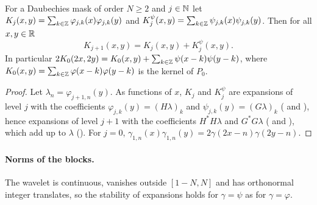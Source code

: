 \begin{proposition}
\label{prop:daub-kernel-identity}
\leanok
{}
For a Daubechies mask of order $N \geq 2$ and $j \in \mathbb{N}$ let
$K_j(x, y) = \sum_{k \in \mathbb{Z}} \varphi_{j,k}(x) \varphi_{j,k}(y)$ and
$K^\psi_j(x, y) = \sum_{k \in \mathbb{Z}} \psi_{j,k}(x) \psi_{j,k}(y)$. Then for all $x, y \in \mathbb{R}$
\[
  K_{j+1}(x, y) = K_j(x, y) + K^\psi_j(x, y) .
\]
In particular $2 K_0(2x, 2y) = K_0(x, y) + \sum_{k \in \mathbb{Z}} \psi(x - k) \psi(y - k)$, where
$K_0(x, y) = \sum_{k \in \mathbb{Z}} \varphi(x - k) \varphi(y - k)$ is the kernel of $P_0$.
\end{proposition}

\begin{proof}
\leanok
{}
Let $\lambda_n = \varphi_{j+1,n}(y)$. As functions of $x$, $K_j$ and $K^\psi_j$ are expansions of
level $j$ with the coefficients $\varphi_{j,k}(y) = (H \lambda)_k$ and
$\psi_{j,k}(y) = (G \lambda)_k$ ( and ),
hence expansions of level $j + 1$ with the coefficients $H^* H \lambda$ and $G^* G \lambda$
( and ), which add up to $\lambda$
(). For $j = 0$,
$\gamma_{1,n}(x) \gamma_{1,n}(y) = 2 \gamma(2x - n) \gamma(2y - n)$.
\end{proof}

\paragraph{Norms of the blocks.}
The wavelet is continuous, vanishes outside $[1 - N, N]$ and has orthonormal integer
translates, so the stability of expansions holds for $\gamma = \psi$ as for $\gamma = \varphi$.

